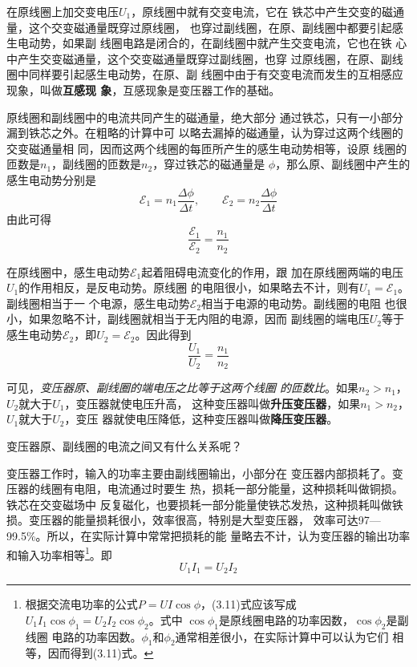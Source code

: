 在原线圈上加交变电压$U_1$，原线圈中就有交变电流，它在
铁芯中产生交变的磁通量，这个交变磁通量既穿过原线圈，
也穿过副线圈，在原、副线圈中都要引起感生电动势，如果副
线圈电路是闭合的，在副线圈中就产生交变电流，它也在铁
心中产生交变磁通量，这个交变磁通量既穿过副线圈，也穿
过原线圈，在原、副线圈中同样要引起感生电动势，在原、副
线圈中由于有交变电流而发生的互相感应现象，叫做\textbf{互感现
象}，互感现象是变压器工作的基础。

原线圈和副线圈中的电流共同产生的磁通量，绝大部分
通过铁芯，只有一小部分漏到铁芯之外。在粗略的计算中可
以略去漏掉的磁通量，认为穿过这两个线圈的交变磁通量相
同，因而这两个线圈的每匝所产生的感生电动势相等，设原
线圈的匝数是$n_1$，副线圈的匝数是$n_2$，穿过铁芯的磁通量是
$\phi$，那么原、副线圈中产生的感生电动势分别是
\[\mathcal{E}_1=n_1\frac{\Delta \phi}{\Delta t},\qquad  \mathcal{E}_2=n_2\frac{\Delta \phi}{\Delta t}\]
由此可得
\begin{equation}
    \frac{\mathcal{E}_1}{\mathcal{E}_2}=\frac{n_1}{n_2} 
\end{equation}

在原线圈中，感生电动势$\mathcal{E}_1$起着阻碍电流变化的作用，跟
加在原线圈两端的电压$U_1$的作用相反，是反电动势。原线圈
的电阻很小，如果略去不计，则有$U_1=\mathcal{E}_1$。副线圈相当于一
个电源，感生电动势$\mathcal{E}_2$相当于电源的电动势。副线圈的电阻
也很小，如果忽略不计，副线圈就相当于无内阻的电源，因而
副线圈的端电压$U_2$等于感生电动势$\mathcal{E}_2$，即$U_2=\mathcal{E}_2$。因此得到
\begin{equation}
    \frac{U_1}{U_2}=\frac{n_1}{n_2} 
\end{equation}

可见，\textit{变压器原、副线圈的端电压之比等于这两个线圈
的匝数比}。如果$n_2>n_1$，$U_2$就大于$U_1$，变压器就使电压升高，
这种变压器叫做\textbf{升压变压器}，如果$n_1>n_2$，$U_1$就大于$U_2$，变压
器就使电压降低，这种变压器叫做\textbf{降压变压器}。

变压器原、副线圈的电流之间又有什么关系呢？

变压器工作时，输入的功率主要由副线圈输出，小部分在
变压器内部损耗了。变压器的线圈有电阻，电流通过时要生
热，损耗一部分能量，这种损耗叫做铜损。铁芯在交变磁场中
反复磁化，也要损耗一部分能量使铁芯发热，这种损耗叫做铁
损。变压器的能量损耗很小，效率很高，特别是大型变压器，
效率可达97—99.5\%。所以，在实际计算中常常把损耗的能
量略去不计，认为变压器的输出功率和输入功率相等\footnote{根据交流电功率的公式$P=UI\cos\phi$，(3.11)式应该写成$U_1I_1\cos\phi_1
=U_2I_2\cos\phi_2$。式中 $\cos\phi_1$是原线圈电路的功率因数，$\cos\phi_2$是副线圈
电路的功率因数。$\phi_1$和$\phi_2$通常相差很小，在实际计算中可以认为它们
相等，因而得到(3.11)式。}。即
\begin{equation}
    U_1I_1=U_2I_2
\end{equation}


